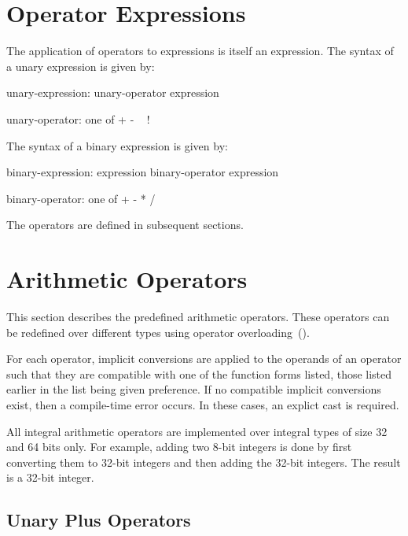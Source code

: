 \section{Operator Expressions}
\label{Binary_Expressions}
\label{Unary_Expressions}

The application of operators to expressions is itself an expression.
The syntax of a unary expression is given by:
\begin{syntax}
unary-expression:
  unary-operator expression

unary-operator: one of
  + - ~ !
\end{syntax}

The syntax of a binary expression is given by:
\begin{syntax}
binary-expression:
  expression binary-operator expression

binary-operator: one of
  + - * / %
\end{syntax}

The operators are defined in subsequent sections.

\section{Arithmetic Operators}
\label{Arithmetic_Operators}

This section describes the predefined arithmetic operators.  These
operators can be redefined over different types using operator
overloading~().

For each operator, implicit conversions are applied to the operands of
an operator such that they are compatible with one of the function
forms listed, those listed earlier in the list being given
preference.  If no compatible implicit conversions exist, then a
compile-time error occurs.  In these cases, an explict cast is required.

All integral arithmetic operators are implemented over integral types
of size 32 and 64 bits only.  For example, adding two 8-bit integers
is done by first converting them to 32-bit integers and then adding
the 32-bit integers.  The result is a 32-bit integer.

\subsection{Unary Plus Operators}
\label{Unary_Plus_Operators}

